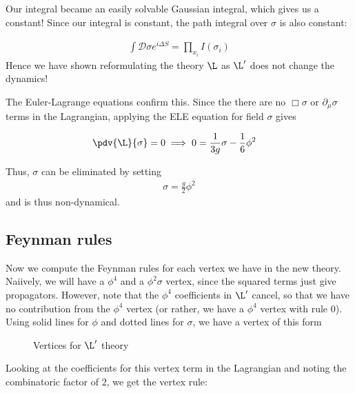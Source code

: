 \documentclass[12pt]{article}
\begin{document}
Our integral became an easily solvable Gaussian integral, which gives us a constant! Since our integral is constant, the path integral over $\sigma$ is also constant:

\begin{align*}
  \int \mathcal{D} \sigma  e^{i \Delta S }=\prod_{x_i} I(\sigma_i)
\end{align*}
Hence we have shown reformulating the theory $\L$ as $\L'$ does not change the dynamics!

The Euler-Lagrange equations confirm this. Since the there are no $\Box \sigma$ or $\partial_\mu \sigma$ terms in the Lagrangian, applying the ELE equation for field $\sigma$ gives

\begin{align*}
  \pdv{\L}{\sigma}&=0 \implies 0=\frac{1}{3 g} \sigma-\frac{1}{6} \phi ^2
\end{align*}

Thus, $\sigma$ can be eliminated by setting
\begin{align}
  \boxed{\sigma=\frac{g}{2} \phi^2}
\end{align}
and is thus non-dynamical. 

\subsection{Feynman rules}
Now we compute the Feynman rules for each vertex we have in the new theory. Naiively, we will have a $\phi^4$ and a $\phi^2 \sigma$ vertex, since the squared terms just give propagators. However, note that the $\phi^4$ coefficients in $\L'$ cancel, so that we have no contribution from the $\phi^4$ vertex (or rather, we have a $\phi^4$ vertex with rule 0). Using solid lines for $\phi$ and dotted lines for $\sigma$, we have a vertex of this form
\begin{figure}[H]
  \centering
  \caption{Vertices for $\L'$ theory}
  \label{fig:vertices}
\end{figure}
Looking at the coefficients for this vertex term in the Lagrangian and noting the combinatoric factor of 2, we get the vertex rule:
\end{document}
